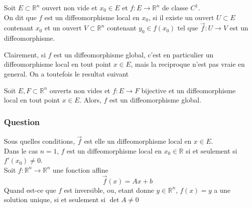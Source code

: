 \documentclass[../main.tex]{subfiles}
\begin{document}
\begin{defn}
	Soit $E \subset \mathbb{R}^n$ ouvert non vide et $x_0 \in E$ et $f: E \to \mathbb{R}^n$ de classe $C^{1}$.\\
	On dit que $f$ est un diffeomorphisme local en $x_0$, si il existe un ouvert $U \subset E$ contenant $x_0$ et un ouvert $V\subset \mathbb{R}^n$  contenant $y_0 \in f( x_0) $ tel que $\vec{f}: U \to V$ est un diffeomorphisme.
\end{defn}
Clairement, si $f$ est un diffeomorphisme global, c'est en particulier un diffeomorphisme local en tout point $x\in E$, mais la reciproque n'est pas vraie en general.
On a toutefois le resultat suivant
\begin{thm}
	Soit $E,F \subset \mathbb{R}^n$ ouverts non vides et $f: E \to F$ bijective et un diffeomorphisme local en tout point $x \in E$. Alors, $f$ est un diffeomorphisme global.
\end{thm}
\subsubsection*{Question}
Sous quelles conditions, $\vec{f}$ est elle un diffeomorphisme local en $x \in E$.\\
Dans le cas $n=1 $, $f$ est un diffeomorphisme local en $x_0\in \mathbb{R}$ si et seulement si $f'( x_0) \neq 0$.\\
Soit $f: \mathbb{R}^n\to \mathbb{R}^n$ une fonction affine
\[ 
	\vec{f}( x) = Ax + b
\]
Quand est-ce que $f$ est inversible, ou, etant donne $y \in \mathbb{R}^n$,  $f( x) = y$ a une solution unique, si et seulement si $\det A \neq 0$\\
\end{document}
